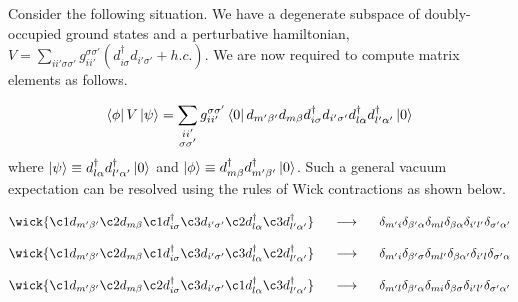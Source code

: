 Consider the following situation. We have a degenerate subspace of doubly-occupied ground states and a perturbative hamiltonian, $V = \sum_{ii'\sigma\sigma'} g^{\sigma\sigma'}_{ii'} (d_{i\sigma}^{\dagger}d_{i'\sigma'} + h.c.)$. We are now required to compute matrix elements as follows.

\begin{equation}
    \bra{\phi}V\ket{\psi} = \sum_{\substack{ii'\\ \sigma\sigma'}} g^{\sigma\sigma'}_{ii'} \bra{0}d_{m'\beta'}d_{m\beta}d_{i\sigma}^{\dagger}d_{i'\sigma'}d_{l\alpha}^{\dagger}d_{l'\alpha'}^{\dagger}\ket{0}
\end{equation}
where $\ket{\psi} \equiv d_{l\alpha}^{\dagger}d_{l'\alpha'}^{\dagger}\ket{0}$ and $\ket{\phi} \equiv d_{m\beta}^{\dagger}d_{m'\beta'}^{\dagger}\ket{0}$. Such a general vacuum expectation can be resolved using the rules of Wick contractions\cite{Kvaal15} as shown below.

\begin{equation}
\wick{
\c1 d_{m'\beta'} 
\c2 d_{m\beta} 
\c1 d_{i\sigma}^{\dagger} 
\c3 d_{i'\sigma'} 
\c2 d_{l\alpha}^{\dagger}  
\c3 d_{l'\alpha'}^{\dagger} 
}
\hspace{0.5cm}
\longrightarrow
\hspace{0.5cm}
\delta_{m'i}
\delta_{\beta'\alpha}
\delta_{ml}
\delta_{\beta\alpha}
\delta_{i'l'}
\delta_{\sigma'\alpha'}
\end{equation}

\begin{equation}
\wick{
\c1 d_{m'\beta'} 
\c2 d_{m\beta} 
\c1 d_{i\sigma}^{\dagger} 
\c3 d_{i'\sigma'} 
\c3 d_{l\alpha}^{\dagger}  
\c2 d_{l'\alpha'}^{\dagger} 
}
\hspace{0.5cm}
\longrightarrow
\hspace{0.5cm}
\delta_{m'i}
\delta_{\beta'\sigma}
\delta_{ml'}
\delta_{\beta\alpha'}
\delta_{i'l}
\delta_{\sigma'\alpha}
\end{equation}

\begin{equation}
\wick{
\c1 d_{m'\beta'} 
\c2 d_{m\beta} 
\c2 d_{i\sigma}^{\dagger} 
\c3 d_{i'\sigma'} 
\c1 d_{l\alpha}^{\dagger}  
\c3 d_{l'\alpha'}^{\dagger} 
}
\hspace{0.5cm}
\longrightarrow
\hspace{0.5cm}
\delta_{m'l}
\delta_{\beta'\alpha}
\delta_{mi}
\delta_{\beta\sigma}
\delta_{i'l'}
\delta_{\sigma'\alpha'}
\end{equation}


